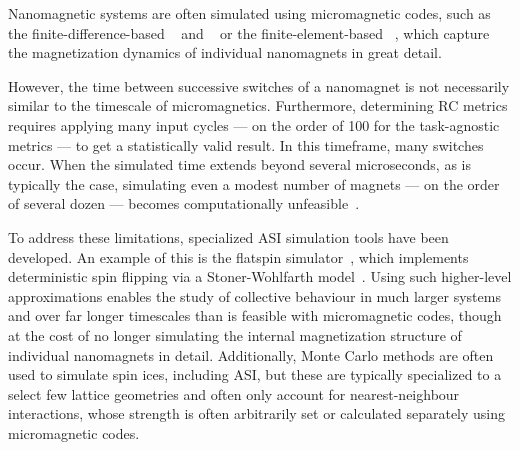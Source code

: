Nanomagnetic systems are often simulated using micromagnetic codes, such as the finite-difference-based \mumax~\cite{mumax3} and \oommf~\cite{OOMMF} or the finite-element-based \nmag~\cite{Nmag}, which capture the magnetization dynamics of individual nanomagnets in great detail. \par
However, the time between successive switches of a nanomagnet is not necessarily similar to the timescale of micromagnetics.
Furthermore, determining RC metrics requires applying many input cycles --- on the order of 100 for the task-agnostic metrics --- to get a statistically valid result.
In this timeframe, many switches occur.
When the simulated time extends beyond several microseconds, as is typically the case, simulating even a modest number of magnets --- on the order of several dozen --- becomes computationally unfeasible~\cite{leo2021chiral}. \\\par

To address these limitations, specialized ASI simulation tools have been developed.
An example of this is the flatspin simulator~\cite{flatspin}, which implements deterministic spin flipping via a Stoner-Wohlfarth model~\cite{StonerWohlfarth2008}.
Using such higher-level approximations enables the study of collective behaviour in much larger systems and over far longer timescales than is feasible with micromagnetic codes, though at the cost of no longer simulating the internal magnetization structure of individual nanomagnets in detail.
Additionally, Monte Carlo methods are often used to simulate spin ices, including ASI, but these are typically specialized to a select few lattice geometries and often only account for nearest-neighbour interactions, whose strength is often arbitrarily set or calculated separately using micromagnetic codes.~\cite{MeltingASI,sklenar2019field,gilbert2014emergent,zhang2013crystallites} \\\par %

